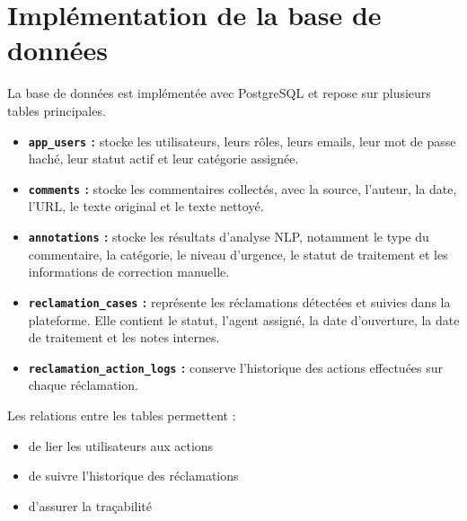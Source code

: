 \documentclass[12pt,a4paper,oneside]{report}
\begin{document}
\section{Implémentation de la base de données}
La base de données est implémentée avec PostgreSQL et repose sur plusieurs tables principales.

\begin{itemize}
    \item \textbf{\texttt{app\_users} :} stocke les utilisateurs, leurs rôles, leurs emails, leur mot de passe haché, leur statut actif et leur catégorie assignée.
    \item \textbf{\texttt{comments} :} stocke les commentaires collectés, avec la source, l’auteur, la date, l’URL, le texte original et le texte nettoyé.
    \item \textbf{\texttt{annotations} :} stocke les résultats d’analyse NLP, notamment le type du commentaire, la catégorie, le niveau d’urgence, le statut de traitement et les informations de correction manuelle.
    \item \textbf{\texttt{reclamation\_cases} :} représente les réclamations détectées et suivies dans la plateforme. Elle contient le statut, l’agent assigné, la date d’ouverture, la date de traitement et les notes internes.
    \item \textbf{\texttt{reclamation\_action\_logs} :} conserve l’historique des actions effectuées sur chaque réclamation.

\end{itemize}

Les relations entre les tables permettent :

\begin{itemize}
    \item de lier les utilisateurs aux actions
    \item de suivre l’historique des réclamations
    \item d’assurer la traçabilité
\end{itemize}
\end{document}
